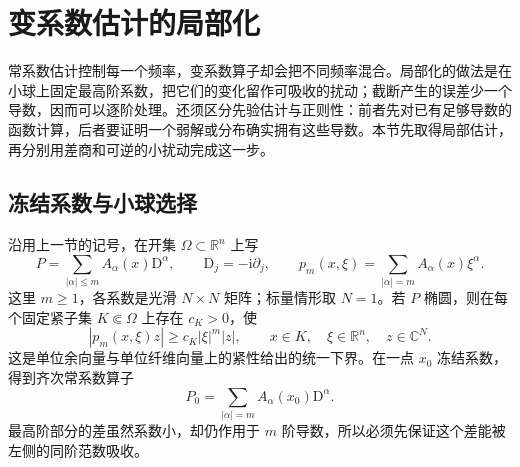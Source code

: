 
% 
% 

\section{变系数估计的局部化}
\label{g3:sec:1203}

常系数估计控制每一个频率，变系数算子却会把不同频率混合。局部化的做法是在小球上固定最高阶系数，把它们的变化留作可吸收的扰动；截断产生的误差少一个导数，因而可以逐阶处理。还须区分先验估计与正则性：前者先对已有足够导数的函数计算，后者要证明一个弱解或分布确实拥有这些导数。本节先取得局部估计，再分别用差商和可逆的小扰动完成这一步。

\subsection{冻结系数与小球选择}
\label{g3:subsec:1203:01}
沿用上一节的记号，在开集 \(\Omega\subset\mathbb R^n\) 上写
\[
	P=\sum_{|\alpha|\le m}A_\alpha(x)\mathrm D^\alpha,
	\qquad \mathrm D_j=-\mathrm i\partial_j,
	\qquad p_m(x,\xi)=\sum_{|\alpha|=m}A_\alpha(x)\xi^\alpha.
\]
这里 \(m\ge1\)，各系数是光滑 \(N\times N\) 矩阵；标量情形取 \(N=1\)。若 \(P\) 椭圆，则在每个固定紧子集 \(K\Subset\Omega\) 上存在 \(c_K>0\)，使
\[
	|p_m(x,\xi)z|\ge c_K|\xi|^m|z|,
	\qquad x\in K,\quad \xi\in\mathbb R^n,\quad z\in\mathbb C^N.
\]
这是单位余向量与单位纤维向量上的紧性给出的统一下界。在一点 \(x_0\) 冻结系数，得到齐次常系数算子
\[
	P_0=\sum_{|\alpha|=m}A_\alpha(x_0)\mathrm D^\alpha.
\]
最高阶部分的差虽然系数小，却仍作用于 \(m\) 阶导数，所以必须先保证这个差能被左侧的同阶范数吸收。

